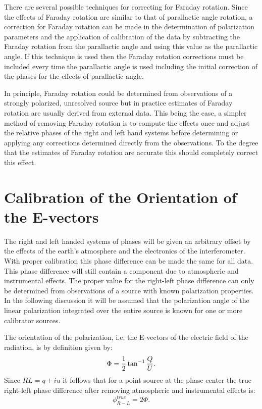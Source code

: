   There are several possible techniques for correcting for Faraday
rotation. Since the effects of Faraday rotation are similar to that of
parallactic angle rotation, a correction for Faraday rotation can be
made in the determination of polarization parameters and the
application of calibration of the data by subtracting the Faraday
rotation from the parallactic angle and using this value as the
parallactic angle.  If this technique is used then the Faraday
rotation corrections must be included every time the parallactic angle
is used including the initial correction of the phases for the effects
of parallactic angle.

   In principle, Faraday rotation could be determined from
observations of a strongly polarized, unresolved source but in
practice estimates of Faraday rotation are usually derived from
external data.  This being the case, a simpler method of removing
Faraday rotation is to compute the effects once and adjust the
relative phases of the right and left hand systems before determining
or applying any corrections determined directly from the observations.
To the degree that the estimates of Faraday rotation are accurate this
should completely correct this effect.

\section{Calibration of the Orientation of the E-vectors}

The right and left handed systems of phases will be given an arbitrary
offset by the effects of the earth's atmosphere and the electronics of
the interferometer.  With proper calibration this phase difference can
be made the same for all data.  This phase difference will still
contain a component due to atmospheric and instrumental effects.  The
proper value for the right-left phase difference can only be
determined from observations of a source with known polarization
properties.  In the following discussion it will be assumed that the
polarization angle of the linear polarization integrated over the
entire source is known for one or more calibrator sources.

\vfil\eject

   The orientation of the polarization, i.e. the E-vectors of the
electric field of the radiation, is by definition given by:
$$\Phi = {1\over{2}} \tan^{-1} {Q\over{U}}.$$
Since $RL = q + iu$ it follows
that for a point source at the phase center the true right-left phase
difference after removing atmospheric and instrumental effects is:
$$\phi^{true}_{R-L} = 2\Phi.$$

